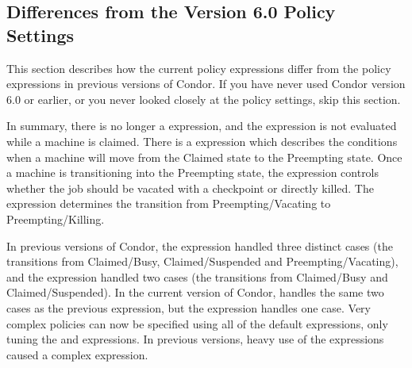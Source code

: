 \subsection{\label{sec:V60-Policy-diffs}Differences from the 
Version 6.0 Policy Settings}

This section describes how the current policy expressions
differ from the policy expressions in previous versions of Condor.
If you have never used Condor version 6.0 or earlier, or you never looked
closely at the policy settings, skip this section.

In summary, there is no longer a  expression, and the
 expression is not evaluated while a machine is claimed. 
There is a  expression which describes the
conditions when a machine will move from the Claimed state to the
Preempting state.
Once a machine is transitioning into the Preempting state, the
 expression controls whether the job should
be vacated with a checkpoint or directly killed.
The  expression determines the transition from
Preempting/Vacating to Preempting/Killing.  

In previous versions of Condor,
the  expression handled three distinct cases
(the transitions from Claimed/Busy, Claimed/Suspended and
Preempting/Vacating), and the  expression handled
two cases (the transitions from Claimed/Busy and Claimed/Suspended).
In the current version of Condor,  handles the
same two cases as the previous  expression,
but the  expression handles one case.
Very complex policies can now be specified using all of
the default expressions, only tuning the  and
 expressions.
In previous versions, heavy use of the 
expressions caused a complex  expression.
